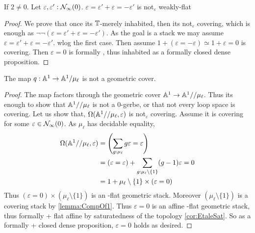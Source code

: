 \documentclass{article}
\begin{document}
\begin{rmk}
	If $2 \neq 0$. Let $\varepsilon , \varepsilon' : \mathcal{N}_\infty(0)$. $\varepsilon = \varepsilon' + \varepsilon = -\varepsilon'$ is not$_\varepsilon$ weakly-flat
\end{rmk}
\begin{proof}
	We prove that once its $\mathbb{T}$-merely inhabited, then its not$_\varepsilon$ covering, which is enough as $\lnot \lnot (\varepsilon = \varepsilon' + \varepsilon = -\varepsilon')$.%
	As the goal is a stack we may assume $\varepsilon = \varepsilon' + \varepsilon = -\varepsilon' $. wlog the first case. Then assume $1 + (\varepsilon = - \varepsilon) \simeq 1 + \varepsilon = 0$ is covering. Then $\varepsilon = 0$ is formally \etale, thus inhabited as a formally \etale closed dense proposition. %
\end{proof}
\begin{example}[Obsolete]
	The map $q : \mathbb{A}^1 \to \mathbb{A}^1 / \mu_\ell$ is not a geometric cover.
\end{example}
\begin{proof}
	The map factors through the geometric cover $\mathbb{A}^1 \to \mathbb{A}^1 // \mu_\ell$. Thus its enough to show that $\mathbb{A}^1 // \mu_\ell$ is not a 0-gerbe, or that not every loop space is covering. 
	Let us show that, $\Omega(\mathbb{A}^1 // \mu_\ell ,\varepsilon)$ is not$_\varepsilon$ covering. Assume it is covering for some $\varepsilon \in \mathcal{N}_\infty(0)$.
	As $\mu_\ell$ has decidable equality,
	\begin{align*}
		\Omega(\mathbb{A}^1 // \mu_\ell , \varepsilon) &= \left (\sum_{g : \mu_\ell} g \varepsilon = \varepsilon \right) \\
		&=  (\varepsilon = \varepsilon) + \sum_{g : \mu_\ell \setminus \{1\}} (g-1) \varepsilon = 0 \\ &= 1 + \mu_\ell \setminus \{1\} \times (\varepsilon = 0) 
	\end{align*}
	Thus $(\varepsilon = 0) \times (\mu_\ell \setminus \{1\})$ is an \etale-flat geometric stack. Moreover $(\mu_\ell \setminus \{1\})$ is a covering stack by \ref{lemma:CompOf1}. Thus $\varepsilon = 0$ is an affine \etale-flat geometric stack, thus formally \etale + flat affine by saturatedness of the \etale topology \ref{cor:EtaleSat}. So as a formally \etale + closed dense proposition, $\varepsilon = 0$ holds as desired. %
\end{proof}
\end{document}

